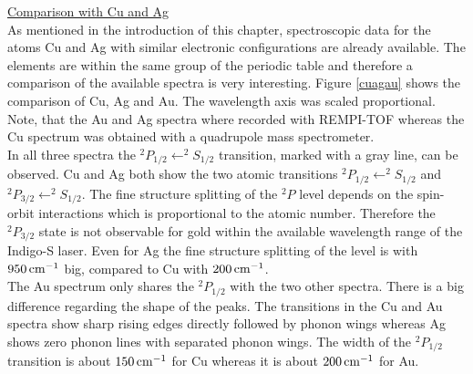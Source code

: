 \documentclass[parskip,12pt,headsepline,a4paper] {scrbook}
\begin{document}
\underline{Comparison with Cu and Ag} \\
As mentioned in the introduction of this chapter, spectroscopic data for the atoms Cu and Ag with similar electronic configurations are already available. The elements are within the same group of the periodic table and therefore a comparison of the available spectra is very interesting. Figure \ref{cuagau} shows the comparison of Cu, Ag and Au. The wavelength axis was scaled proportional. Note, that the Au and Ag spectra where recorded with REMPI-TOF whereas the Cu spectrum was obtained with a quadrupole mass spectrometer. \\
In all three spectra the $^2P_{1/2} \leftarrow ^2S_{1/2}$ transition, marked with a gray line, can be observed. Cu and Ag both show the two atomic transitions $^2P_{1/2} \leftarrow ^2S_{1/2}$ and $^2P_{3/2} \leftarrow ^2S_{1/2}$. The fine structure splitting of the $^2P$ level depends on the spin-orbit interactions which is proportional to the atomic number. Therefore the $^2P_{3/2}$ state is not observable for gold within the available wavelength range of the Indigo-S laser. Even for Ag the fine structure splitting of the level is with $\unit[950]{cm^{-1}}$ big, compared to Cu with $\unit[200]{cm^{-1}}$. \\
The Au spectrum only shares the $^2P_{1/2}$ with the two other spectra. There is a big difference regarding the shape of the peaks. The transitions in the Cu and Au spectra show sharp rising edges directly followed by phonon wings whereas Ag shows zero phonon lines with separated phonon wings. The width of the $^2P_{1/2}$ transition is about $\unit[150]{cm^{-1}}$ for Cu whereas it is about $\unit[200]{cm^{-1}}$ for Au.
\end{document}
